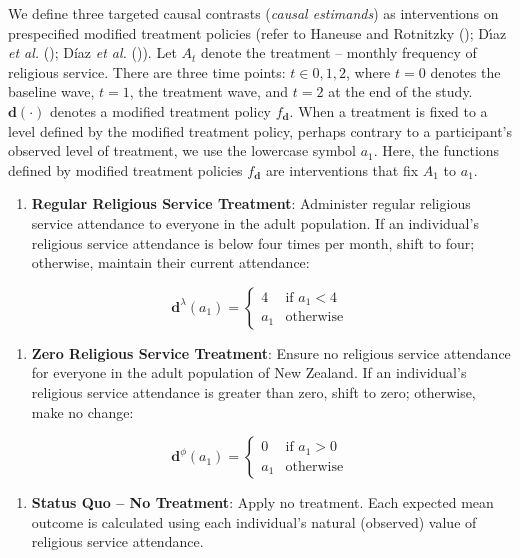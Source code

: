 \documentclass[
  single column]{article}
\providecommand{\tightlist}{%
  \setlength{\itemsep}{0pt}\setlength{\parskip}{0pt}}\usepackage{longtable,booktabs,array}
\begin{document}
We define three targeted causal contrasts (\emph{causal estimands}) as
interventions on prespecified modified treatment policies (refer to
Haneuse and Rotnitzky (); Dı́az
\emph{et al.} (); Díaz
\emph{et al.} ()). Let \(A_t\) denote
the treatment -- monthly frequency of religious service. There are three
time points: \(t\in{0,1,2}\), where \(t=0\) denotes the baseline wave,
\(t=1\), the treatment wave, and \(t=2\) at the end of the study.
\(\mathbf{d}(\cdot)\) denotes a modified treatment policy
\(f_\mathbf{d}\). When a treatment is fixed to a level defined by the
modified treatment policy, perhaps contrary to a participant's observed
level of treatment, we use the lowercase symbol \(a_1\). Here, the
functions defined by modified treatment policies \(f_\mathbf{d}\) are
interventions that fix \(A_1\) to \(a_1\).

\begin{enumerate}
\def\labelenumi{\arabic{enumi}.}
\tightlist
\item
  \textbf{Regular Religious Service Treatment}: Administer regular
  religious service attendance to everyone in the adult population. If
  an individual's religious service attendance is below four times per
  month, shift to four; otherwise, maintain their current attendance:
\end{enumerate}

\[
\mathbf{d}^\lambda (a_1) = \begin{cases} 4 & \text{if } a_1 < 4 \\ 
a_1 & \text{otherwise} \end{cases}
\]

\begin{enumerate}
\def\labelenumi{\arabic{enumi}.}
\setcounter{enumi}{1}
\tightlist
\item
  \textbf{Zero Religious Service Treatment}: Ensure no religious service
  attendance for everyone in the adult population of New Zealand. If an
  individual's religious service attendance is greater than zero, shift
  to zero; otherwise, make no change:
\end{enumerate}

\[
\mathbf{d}^\phi (a_1) = \begin{cases} 0 & \text{if } a_1 > 0 \\ 
a_1 & \text{otherwise} \end{cases}
\]

\begin{enumerate}
\def\labelenumi{\arabic{enumi}.}
\setcounter{enumi}{2}
\tightlist
\item
  \textbf{Status Quo -- No Treatment}: Apply no treatment. Each expected
  mean outcome is calculated using each individual's natural (observed)
  value of religious service attendance.
\end{enumerate}
\end{document}
